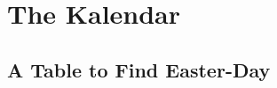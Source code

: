 \newcommand \Sol[1]{{\versiculus☉}~in~{\versiculus#1}}
\newcommand \dub[1]{{\footnotesize\sffamily #1}}		%
\newcommand \mem[1]{\emph{#1}} %


\chapter{The Kalendar}


\newpage

\section*{A Table to Find Easter-Day}
